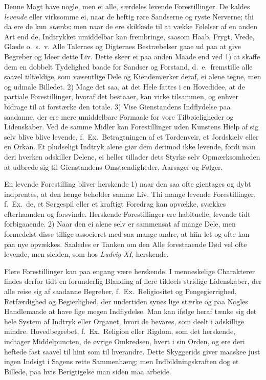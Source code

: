 \documentclass[12pt,a4paper]{article}
\newcommand{\opage}[1]{\marginnote{\footnotesize\textit{[#1]}}}
\begin{document}
\opage{101} Denne Magt have nogle, men ei alle, særdeles levende Forestillinger. De kaldes
\emph{levende} eller virksomme ei, naar de heftig røre Sandserne og ryste Nerverne; thi
da ere de kun \emph{stærke}: men naar de ere skikkede til at vække Følelser af en anden
Art end de, Indtrykket umiddelbar kan frembringe, saasom Haab, Frygt, Vrede, Glæde
o.~s.~v. Alle Talernes og Digternes Bestræbelser gaae ud paa at give Begreber og Ideer
dette Liv. Dette skeer ei paa anden Maade end ved 1) at skaffe dem en dobbelt Tydelighed
baade for Sandser og Forstand, d.~e.\ fremstille alle saavel tilfældige, som væsentlige
Dele og Kiendemærker deraf, ei alene tegne, men og udmale Billedet. 2) Mage det saa, at
det Hele fattes i en Hovedidee, at de partiale Forestillinger, hvoraf det bestaaer, kan
virke tilsammen, og enhver bidrage til at forstærke den totale. 3) Vise Gienstandens
Indflydelse paa saadanne, der ere mere umiddelbare Formaale for vore Tilbøieligheder og
Lidenskaber. Ved de samme Midler kan Forestillinger uden Kunstens Hielp af sig selv
blive blive levende, f.~Ex.\ Betragtningen af et Tordenveir, et Jordskælv eller en Orkan.
Et pludseligt Indtryk alene giør dem derimod ikke levende, fordi man deri hverken
adskiller Delene, ei heller tillader dets Styrke selv Opmærksomheden at udbrede sig til
Gienstandens Omstændigheder, Aarsager og Følger.

\opage{102} En levende Forestilling bliver herskende 1) naar den saa ofte gientages og dybt
indprentes, at den længe beholder samme Liv. Thi mange levende Forestillinger, f.~Ex.\
de, et Sørgespil eller et kraftigt Foredrag kan opvække, svækkes efterhaanden og
forsvinde. Herskende Forestillinger ere habituelle, levende tidt forbigaaende. 2) Naar
den ei alene selv er sammensat af mange Dele, men formedelst disse tillige associeret med
saa mange andre, at hiin let og ofte kan paa nye opvækkes. Saaledes er Tanken om den Alle
forestaaende Død vel ofte levende, men sielden, som hos \emph{Ludvig XI}, herskende.

Flere Forestillinger kan paa engang være herskende. I menneskelige Charakterer findes
derfor tidt en forunderlig Blanding af flere tildeels stridige Lidenskaber, der alle
reise sig af saadanne Begreber, f.~Ex.\ Religiositet og Pengegierrighed, Retfærdighed og
Begierlighed, der undertiden synes lige stærke og paa Nogles Handlemaade at have lige
megen Indflydelse. Man kan ifølge heraf tænke sig det hele System af Indtryk eller
Organet, hvori de bevares, som deelt i adskillige mindre. Hovedbegrebet, f.~Ex.\ Religion
eller Rigdom, som det herskende, indtager Middelpuncten, de øvrige Omkredsen, hvert i sin
Orden, og ere deri heftede fast saavel til hint som til hverandre. Dette Skyggerids giver
maaskee just ingen Indsigt i Sagens rette Sammenhæng; men Indbildningskraften dog et
Billede, paa hvis Berigtigelse man siden maa arbeide.
\end{document}
